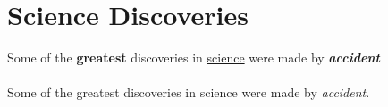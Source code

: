 \documentclass{article}
\begin{document}
	\section{Science Discoveries}
	Some of the \textbf{greatest}
	discoveries in \underline{science}
	were made by
	\textbf{\textit{accident}}
	
	\paragraph{}
	Some of the greatest discoveries in science were made by \emph{accident}.
	
\end{document}
